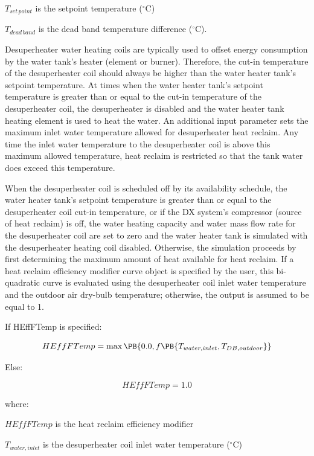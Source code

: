 \({T_{set\,point}}\) is the setpoint temperature (\(^{\circ}\)C)

\({T_{dead\,band}}\) is the dead band temperature difference (\(^{\circ}\)C).

Desuperheater water heating coils are typically used to offset energy consumption by the water tank's heater (element or burner). Therefore, the cut-in temperature of the desuperheater coil should always be higher than the water heater tank's setpoint temperature. At times when the water heater tank's setpoint temperature is greater than or equal to the cut-in temperature of the desuperheater coil, the desuperheater is disabled and the water heater tank heating element is used to heat the water. An additional input parameter sets the maximum inlet water temperature allowed for desuperheater heat reclaim. Any time the inlet water temperature to the desuperheater coil is above this maximum allowed temperature, heat reclaim is restricted so that the tank water does exceed this temperature.

When the desuperheater coil is scheduled off by its availability schedule, the water heater tank's setpoint temperature is greater than or equal to the desuperheater coil cut-in temperature, or if the DX system's compressor (source of heat reclaim) is off, the water heating capacity and water mass flow rate for the desuperheater coil are set to zero and the water heater tank is simulated with the desuperheater heating coil disabled. Otherwise, the simulation proceeds by first determining the maximum amount of heat available for heat reclaim. If a heat reclaim efficiency modifier curve object is specified by the user, this bi-quadratic curve is evaluated using the desuperheater coil inlet water temperature and the outdoor air dry-bulb temperature; otherwise, the output is assumed to be equal to 1.

If HEffFTemp is specified:

\begin{equation}
  HEffFTemp = \max\PB{0.0, f\PB{T_{water,inlet},T_{DB,outdoor}}}
\end{equation}

Else:

\begin{equation}
  HEffFTemp = 1.0
\end{equation}

where:

\(HEffFTemp\) is the heat reclaim efficiency modifier

\({T_{water,inlet}}\) is the desuperheater coil inlet water temperature (\(^{\circ}\)C)

